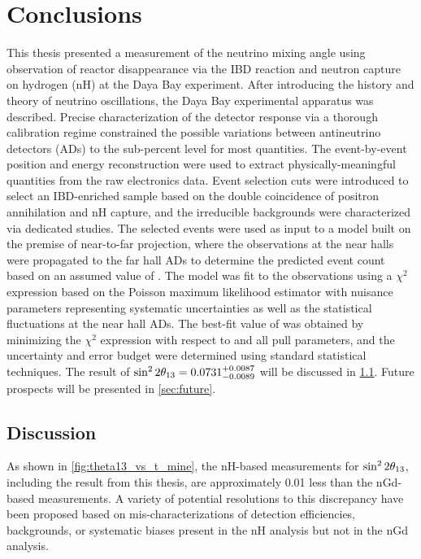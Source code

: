\chapter{Conclusions}
\label{ch:conclusions}

This thesis presented a measurement of
the neutrino mixing angle \thetaot{}
using observation of reactor \nuebar{} disappearance
via the IBD reaction and neutron capture on hydrogen (nH)
at the Daya Bay experiment.
After introducing the history and theory of neutrino oscillations,
the Daya Bay experimental apparatus was described.
Precise characterization of the detector response
via a thorough calibration regime
constrained the possible variations between antineutrino detectors (ADs)
to the sub-percent level for most quantities.
The event-by-event position and energy reconstruction were used
to extract physically-meaningful quantities from the raw electronics data.
Event selection cuts were introduced to select an IBD-enriched sample
based on the double coincidence of positron annihilation and nH capture,
and the irreducible backgrounds were characterized via dedicated studies.
The selected events were used as input to a model
built on the premise of near-to-far projection,
where the observations at the near halls
were propagated to the far hall ADs
to determine the predicted event count based on an assumed value of \thetaot{}.
The model was fit to the observations using a $\chi^2$ expression
based on the Poisson maximum likelihood estimator
with nuisance parameters representing systematic uncertainties
as well as the statistical fluctuations at the near hall ADs.
The best-fit value of \thetaot{} was obtained by minimizing the $\chi^2$ expression
with respect to \thetaot{} and all pull parameters,
and the uncertainty and error budget were determined
using standard statistical techniques.
The result of $\sin^22\theta_{13} = 0.0731^{+0.0087}_{-0.0089}$
will be discussed in \cref{sec:discussion}.
Future prospects will be presented in \cref{sec:future}.

\section{Discussion}
\label{sec:discussion}

As shown in \cref{fig:theta13_vs_t_mine}, the nH-based measurements for $\sin^22\theta_{13}{}$,
including the result from this thesis, are approximately 0.01
less than the nGd-based measurements.
A variety of potential resolutions to this discrepancy have been proposed
based on mis-characterizations of detection efficiencies, backgrounds,
or systematic biases present in the nH analysis but not in the nGd analysis.

